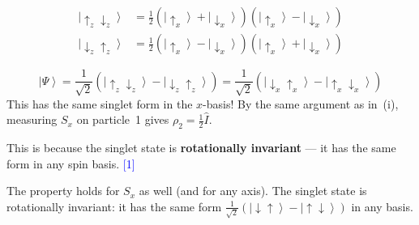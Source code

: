 \documentclass[12pt,a4paper]{article}
\newcommand{\markstep}[1]{\hfill\textcolor{blue}{[#1]}}
\newcommand{\finalanswer}[1]{%
  \begin{tcolorbox}[colback=green!5!white,colframe=green!50!black,boxrule=0.5pt]
  #1
  \end{tcolorbox}
}
\renewcommand{\ket}[1]{\left|#1\right\rangle}
\begin{document}
\begin{parts}
\begin{parts}
\begin{align*}
\ket{\!\uparrow_z\downarrow_z} &= \frac{1}{2}(\ket{\!\uparrow_x}+\ket{\!\downarrow_x})(\ket{\!\uparrow_x}-\ket{\!\downarrow_x})\\
\ket{\!\downarrow_z\uparrow_z} &= \frac{1}{2}(\ket{\!\uparrow_x}-\ket{\!\downarrow_x})(\ket{\!\uparrow_x}+\ket{\!\downarrow_x})
\end{align*}

\[
\ket{\Psi} = \frac{1}{\sqrt{2}}(\ket{\!\uparrow_z\downarrow_z}-\ket{\!\downarrow_z\uparrow_z}) = \frac{1}{\sqrt{2}}(\ket{\!\downarrow_x\uparrow_x}-\ket{\!\uparrow_x\downarrow_x})
\]
This has the same singlet form in the $x$-basis! By the same argument as in~(i), measuring $S_x$ on particle~1 gives $\rho_2 = \tfrac{1}{2}\hat{I}$.

This is because the singlet state is \textbf{rotationally invariant} --- it has the same form in any spin basis. \markstep{1}

\finalanswer{The property holds for $S_x$ as well (and for any axis). The singlet state is rotationally invariant: it has the same form $\frac{1}{\sqrt{2}}(\ket{\!\downarrow\uparrow}-\ket{\!\uparrow\downarrow})$ in any basis.}
\end{parts}
\end{parts}
\end{document}
